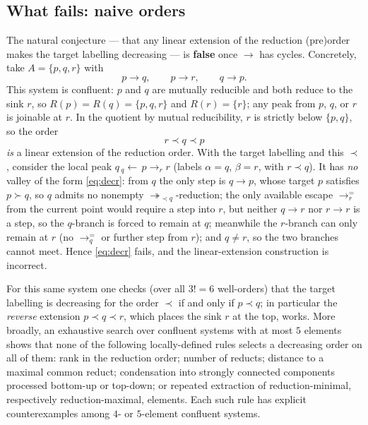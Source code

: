 \documentclass{amsart}
\theoremstyle{definition}
\theoremstyle{remark}
\newcommand{\redto}{\rightarrow}
\newcommand{\redtt}{\twoheadrightarrow}
\begin{document}
\subsection*{What fails: naive orders}
The natural conjecture --- that any linear extension of the reduction (pre)order
makes the target labelling decreasing --- is \textbf{false} once $\redto$ has
cycles.  Concretely, take $A=\{p,q,r\}$ with
\[
   p\redto q,\qquad p\redto r,\qquad q\redto p .
\]
This system is confluent: $p$ and $q$ are mutually reducible and both reduce to
the sink $r$, so $R(p)=R(q)=\{p,q,r\}$ and $R(r)=\{r\}$; any peak from $p$, $q$,
or $r$ is joinable at $r$.  In the quotient by mutual reducibility, $r$ is
strictly below $\{p,q\}$, so the order
\[
   r\prec q\prec p
\]
\emph{is} a linear extension of the reduction order.  With the target labelling
and this $\prec$, consider the local peak
$q\,{}_q{\leftarrow}\,p\redto_r r$ (labels $\alpha=q$, $\beta=r$, with
$r\prec q$).  It has \emph{no} valley of the form \eqref{eq:decr}: from $q$ the
only step is $q\redto p$, whose target $p$ satisfies $p\succ q$, so $q$ admits no
nonempty $\redtt_{\prec q}$-reduction; the only available escape $\redto^{=}_r$
from the current point would require a step into $r$, but neither $q\redto r$ nor
$r\redto r$ is a step, so the $q$-branch is forced to remain at $q$; meanwhile
the $r$-branch can only remain at $r$ (no $\redto^{=}_q$ or further step from
$r$); and $q\neq r$, so the two branches cannot meet.  Hence \eqref{eq:decr}
fails, and the linear-extension construction is incorrect.

For this same system one checks (over all $3!=6$ well-orders) that the target
labelling is decreasing for the order $\prec$ if and only if $p\prec q$; in
particular the \emph{reverse} extension $p\prec q\prec r$, which places the sink
$r$ at the top, works.  More broadly, an exhaustive search over confluent
systems with at most $5$ elements shows that none of the following
locally-defined rules selects a decreasing order on all of them: rank in the
reduction order; number of reducts; distance to a maximal common reduct;
condensation into strongly connected components processed bottom-up or top-down;
or repeated extraction of reduction-minimal, respectively reduction-maximal,
elements.  Each such rule has explicit counterexamples among $4$- or
$5$-element confluent systems.
\end{document}
